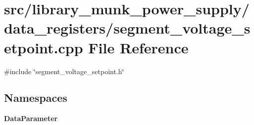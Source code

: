 \section{src/library\+\_\+munk\+\_\+power\+\_\+supply/data\+\_\+registers/segment\+\_\+voltage\+\_\+setpoint.cpp File Reference}
\label{segment__voltage__setpoint_8cpp}
{\ttfamily \#include \char`\"{}segment\+\_\+voltage\+\_\+setpoint.\+h\char`\"{}}\newline
\subsection*{Namespaces}
\begin{DoxyCompactItemize}
\item 
 \textbf{ Data\+Parameter}
\end{DoxyCompactItemize}
